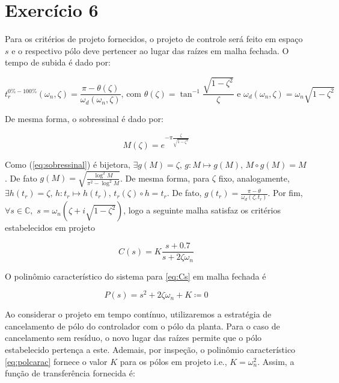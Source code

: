 \section*{Exercício 6}
\label{ex:6}

    Para os critérios de projeto fornecidos, o projeto de controle será feito em espaço $s$ e o respectivo pólo deve pertencer ao lugar das raízes em malha fechada. O tempo de subida é dado por:
    
        \begin{equation}
            t^{0\% - 100\%}_{r}(\omega_n, \zeta) = \frac{\pi - \theta(\zeta)}{\omega_d(\omega_n, \zeta)} \mbox{, com } \theta(\zeta) = \tan^{-1}\frac{\sqrt{1 - \zeta^2}}{\zeta} \mbox{ e } \omega_d(\omega_n, \zeta) = \omega_n \sqrt{1-\zeta^2}
            \label{eq:tempo_de_subida}
        \end{equation}
    
    De mesma forma, o sobressinal é dado por:
    
        \begin{equation}
            M(\zeta) = e^{-\pi \frac{\zeta}{\sqrt{1-\zeta^2}}}
            \label{eq:sobressinal}
        \end{equation}
    
    Como (\ref{eq:sobressinal}) é bijetora, $\exists g(M) = \zeta \mbox{, } g: M \longmapsto g(M) \mbox{, } M \circ g (M) = M$. De fato $g(M) = \sqrt{\frac{\log^2{M}}{\pi^2 - \log^2{M}}}$. De mesma forma, para $\zeta$ fixo, analogamente, $\exists h(t_r) = \zeta\mbox{, }h: t_r \longmapsto h(t_r)\mbox{, } t_r(\zeta) \circ h = t_r$. De fato, $g(t_r) = \frac{\pi - \theta}{\omega_d(\zeta, t_r)}$. Por fim, $\forall s \in \mathbb{C}, \,\, s = \omega_n (\zeta + i \sqrt{1 - \zeta^2})$, logo a seguinte malha satisfaz os critérios estabelecidos em projeto
    
        \begin{equation}
        C(s) = K \frac{s + 0.7}{s + 2 \zeta \omega_n}
        \label{eq:Cs}
        \end{equation}
    
    O polinômio característico do sistema para \eqref{eq:Cs} em malha fechada é 
    
        \begin{equation}
        P(s) = s^2 + 2\zeta \omega_n + K \coloneqq 0
        \label{eq:polcarac}
        \end{equation}
    
    Ao considerar o projeto em tempo contínuo, utilizaremos a estratégia de cancelamento de pólo do controlador com o pólo da planta. Para o caso de cancelamento sem resíduo, o novo lugar das raízes permite que o pólo estabelecido pertença a este. Ademais, por inspeção, o polinômio característico \eqref{eq:polcarac} fornece o valor $K$ para os pólos em projeto i.e., $K = \omega_n^2$. Assim, a função de transferência fornecida é:
    
